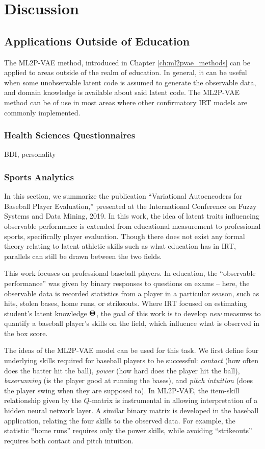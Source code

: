 \chapter{Discussion}\label{ch:conclusion}

\section{Applications Outside of Education}
The ML2P-VAE method, introduced in Chapter \ref{ch:ml2pvae_methods} can be applied to areas outside of the realm of education. In general, it can be useful when some unobservable latent code is assumed to generate the observable data, and domain knowledge is available about said latent code. The ML2P-VAE method can be of use in most areas where other confirmatory IRT models are commonly implemented. 

\subsection{Health Sciences Questionnaires}
BDI, personality 

\subsection{Sports Analytics}
In this section, we summarize the publication ``Variational Autoencoders for Baseball Player Evaluation,'' \cite{fsdm_paper} presented at the International Conference on Fuzzy Systems and Data Mining, 2019. In this work, the idea of latent traits influencing observable performance is extended from educational measurement to professional sports, specifically player evaluation. Though there does not exist any formal theory relating to latent athletic skills such as what education has in IRT, parallels can still be drawn between the two fields.

This work focuses on professional baseball players. In education, the ``observable performance'' was given by binary responses to questions on exams -- here, the observable data is recorded statistics from a player in a particular season, such as hits, stolen bases, home runs, or strikeouts. Where IRT focused on estimating student's latent knowledge $\boldsymbol{\Theta}$, the goal of this work is to develop \textit{new} measures to quantify a baseball player's skills on the field, which influence what is observed in the box score.

The ideas of the ML2P-VAE model can be used for this task. We first define four underlying skills required for baseball players to be successful: \textit{contact} (how often does the batter hit the ball), \textit{power} (how hard does the player hit the ball), \textit{baserunning} (is the player good at running the bases), and \textit{pitch intuition} (does the player swing when they are supposed to). In ML2P-VAE, the item-skill relationship given by the $Q$-matrix is instrumental in allowing interpretation of a hidden neural network layer. A similar binary matrix is developed in the baseball application, relating the four skills to the observed data. For example, the statistic ``home runs'' requires only the power skills, while avoiding ``strikeouts'' requires both contact and pitch intuition.

